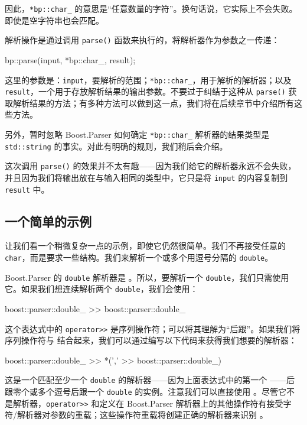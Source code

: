 因此，\texttt{*bp::char\_} 的意思是“任意数量的字符”。换句话说，它实际上不会失败。即使是空字符串也会匹配。

解析操作是通过调用 \texttt{parse()} 函数来执行的，将解析器作为参数之一传递：

\begin{code}
bp::parse(input, *bp::char_, result);
\end{code}

这里的参数是：\texttt{input}，要解析的范围；\texttt{*bp::char\_}，用于解析的解析器；以及 \texttt{result}，一个用于存放解析结果的输出参数。不要过于纠结于这种从 \texttt{parse()} 获取解析结果的方法；有多种方法可以做到这一点，我们将在后续章节中介绍所有这些方法。

另外，暂时忽略 Boost.Parser 如何确定 \texttt{*bp::char\_} 解析器的结果类型是 \texttt{std::string} 的事实。对此有明确的规则，我们稍后会介绍。

这次调用 \texttt{parse()} 的效果并不太有趣——因为我们给它的解析器永远不会失败，并且因为我们将输出放在与输入相同的类型中，它只是将 \texttt{input} 的内容复制到 \texttt{result} 中。

\subsection{一个简单的示例}

让我们看一个稍微复杂一点的示例，即使它仍然很简单。我们不再接受任意的 \texttt{char}，而是要求一些结构。我们来解析一个或多个用逗号分隔的 \texttt{double}。

Boost.Parser 的 \texttt{double} 解析器是 。所以，要解析一个 \texttt{double}，我们只需使用它。如果我们想连续解析两个 \texttt{double}，我们会使用：

\begin{code}
boost::parser::double_ >> boost::parser::double_
\end{code}

这个表达式中的 \texttt{operator>>} 是序列操作符；可以将其理解为“后跟”。如果我们将序列操作符与 结合起来，我们可以通过编写以下代码来获得我们想要的解析器：

\begin{code}
boost::parser::double_ >> *(',' >> boost::parser::double_)
\end{code}

这是一个匹配至少一个 \texttt{double} 的解析器——因为上面表达式中的第一个 ——后跟零个或多个逗号后跟一个 \texttt{double} 的实例。注意我们可以直接使用 。尽管它不是解析器，\texttt{operator>>} 和定义在 Boost.Parser 解析器上的其他操作符有接受字符/解析器对参数的重载；这些操作符重载将创建正确的解析器来识别 。

